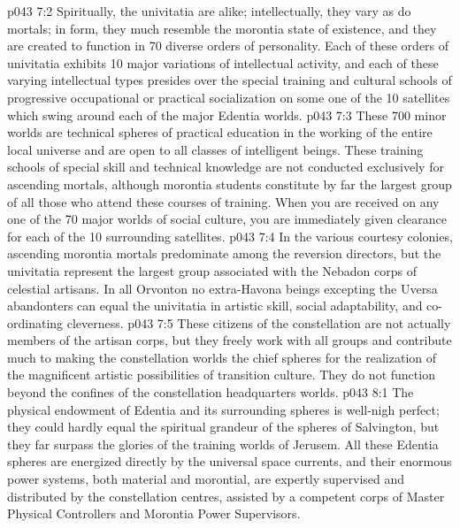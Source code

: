\vs p043 7:2 Spiritually, the univitatia are alike; intellectually, they vary as do mortals; in form, they much resemble the morontia state of existence, and they are created to function in 70 diverse orders of personality. Each of these orders of univitatia exhibits 10 major variations of intellectual activity, and each of these varying intellectual types presides over the special training and cultural schools of progressive occupational or practical socialization on some one of the 10 satellites which swing around each of the major Edentia worlds.
\vs p043 7:3 These 700 minor worlds are technical spheres of practical education in the working of the entire local universe and are open to all classes of intelligent beings. These training schools of special skill and technical knowledge are not conducted exclusively for ascending mortals, although morontia students constitute by far the largest group of all those who attend these courses of training. When you are received on any one of the 70 major worlds of social culture, you are immediately given clearance for each of the 10 surrounding satellites.
\vs p043 7:4 In the various courtesy colonies, ascending morontia mortals predominate among the reversion directors, but the univitatia represent the largest group associated with the Nebadon corps of celestial artisans. In all Orvonton no extra\hyp{}Havona beings excepting the Uversa abandonters can equal the univitatia in artistic skill, social adaptability, and co\hyp{}ordinating cleverness.
\vs p043 7:5 These citizens of the constellation are not actually members of the artisan corps, but they freely work with all groups and contribute much to making the constellation worlds the chief spheres for the realization of the magnificent artistic possibilities of transition culture. They do not function beyond the confines of the constellation headquarters worlds.
\vs p043 8:1 The physical endowment of Edentia and its surrounding spheres is well\hyp{}nigh perfect; they could hardly equal the spiritual grandeur of the spheres of Salvington, but they far surpass the glories of the training worlds of Jerusem. All these Edentia spheres are energized directly by the universal space currents, and their enormous power systems, both material and morontial, are expertly supervised and distributed by the constellation centres, assisted by a competent corps of Master Physical Controllers and Morontia Power Supervisors.
